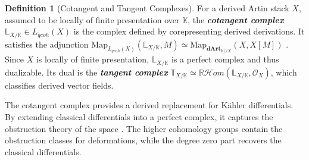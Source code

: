 \documentclass[reqno]{amsart}
\theoremstyle{definition}
\newtheorem{definition}[theorem]{Definition}
\theoremstyle{remark}
\newcommand{\LL}{\mathbb{L}}
\newcommand{\TT}{\mathbb{T}}
\newcommand{\cO}{\mathcal{O}}
\newcommand{\K}{\mathbb{K}}
\newcommand{\dArt}{\mathbf{dArt}}
\newcommand{\bfem}[1]{\textbf{\textit{#1}}}
\begin{document}
\begin{definition}[Cotangent and Tangent Complexes]
  For a derived Artin stack $X$, assumed to be locally of finite
  presentation over $\K$, the \bfem{cotangent complex}
  $\LL_{X/\K} \in L_{qcoh}(X)$ is the complex defined by
  corepresenting derived derivations. It satisfies the adjunction
  $\mathrm{Map}_{L_{qcoh}(X)}(\LL_{X/\K}, M) \simeq
  \mathrm{Map}_{\dArt_{\K // X}}(X, X[M])$ \cite[Section
  1.3.1]{CPTVV}. Since $X$ is locally of finite presentation,
  $\LL_{X/\K}$ is a perfect complex and thus dualizable. Its dual is the
  \bfem{tangent complex} $\TT_{X/\K} \simeq
  \mathbb{R}\underline{\mathcal{H}om}(\LL_{X/\K}, \cO_X)$, which
  classifies derived vector fields.
\end{definition}

The cotangent complex provides a derived replacement for
K\"{a}hler differentials. By extending classical differentials
into a perfect complex, it captures the obstruction theory of
the space \cite[Section 1.1]{Calaque}. The higher cohomology groups
contain the obstruction classes for deformations, while
the degree zero part recovers the classical differentials.
\end{document}
